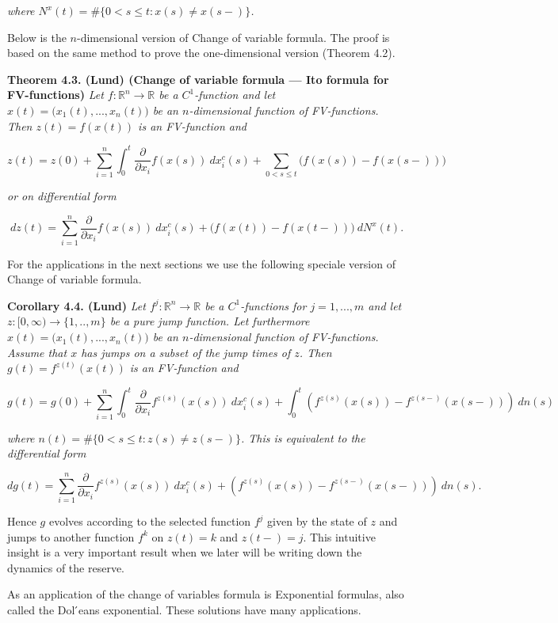 \documentclass[a4paper,10pt,openany]{book}
\begin{document}
\emph{where \(N^x(t)=\#\{0<s\le t: x(s)\ne x(s-)\}\).}

Below is the \(n\)-dimensional version of Change of variable formula. The proof is based on the same method to prove the one-dimensional version (Theorem 4.2).

\textbf{Theorem 4.3. (Lund) (Change of variable formula --- Ito formula for FV-functions)} \emph{Let \(f : \mathbb R^n\to\mathbb R\) be a \(C^1\)-function and let \(x(t)=\big(x_1(t),...,x_n(t)\big)\) be an \(n\)-dimensional function of FV-functions. Then \(z(t)=f(x(t))\) is an FV-function and}

\[
z(t)=z(0)+\sum_{i=1}^n\int_0^t\frac{\partial}{\partial x_i}f(x(s))\ dx_i^c(s)+\sum_{0<s\le t}\Big(f(x(s))-f(x(s-))\Big)
\]

\emph{or on differential form}

\[
dz(t)=\sum_{i=1}^n\frac{\partial}{\partial x_i}f(x(s))\ dx_i^c(s)+\Big(f(x(t))-f(x(t-))\Big)\ dN^x(t).
\]

For the applications in the next sections we use the following speciale version of Change of variable formula.

\textbf{Corollary 4.4. (Lund)} \emph{Let \(f^j : \mathbb R^n\to\mathbb R\) be a \(C^1\)-functions for \(j=1,...,m\) and let \(z : [0,\infty) \to \{1,..,m\}\) be a pure jump function. Let furthermore \(x(t)=\big(x_1(t),...,x_n(t)\big)\) be an \(n\)-dimensional function of FV-functions. Assume that \(x\) has jumps on a subset of the jump times of \(z\). Then \(g(t)=f^{z(t)}(x(t))\) is an FV-function and}

\[
g(t)=g(0)+\sum_{i=1}^n\int_0^t\frac{\partial}{\partial x_i}f^{z(s)}(x(s))\ dx_i^c(s)+\int_0^t\left(f^{z(s)}(x(s))-f^{z(s-)}(x(s-))\right)\ dn(s)
\]

\emph{where \(n(t)=\#\{0<s\le t: z(s)\ne z(s-)\}\). This is equivalent to the differential form}

\[
dg(t)=\sum_{i=1}^n\frac{\partial}{\partial x_i}f^{z(s)}(x(s))\ dx_i^c(s)+\left(f^{z(s)}(x(s))-f^{z(s-)}(x(s-))\right)\ dn(s).
\]

Hence \(g\) evolves according to the selected function \(f^j\) given by the state of \(z\) and jumps to another function \(f^k\) on \(z(t)=k\) and \(z(t-)=j\). This intuitive insight is a very important result when we later will be writing down the dynamics of the reserve.

As an application of the change of variables formula is Exponential formulas, also called the Dol ́eans exponential. These solutions have many applications.
\end{document}
